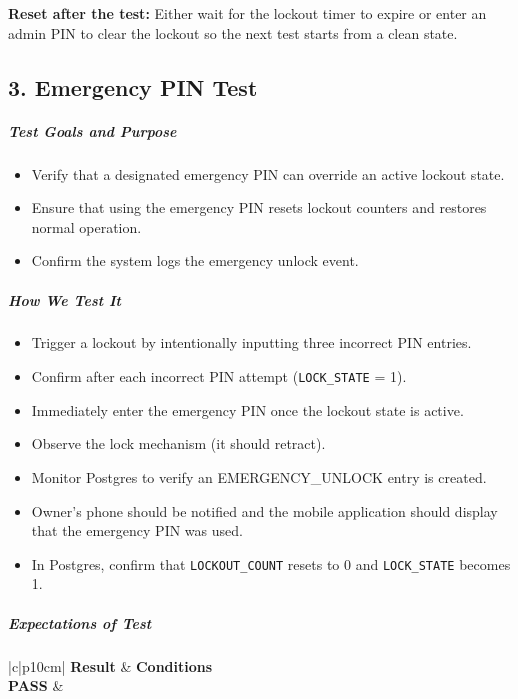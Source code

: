\noindent\textbf{Reset after the test:}  
Either wait for the lockout timer to expire or enter an admin PIN to clear the lockout so the next test starts from a clean state.\\


\newpage
\begin{samepage}
    \subsection*{3. Emergency PIN Test}
    \subparagraph{Test Goals and Purpose}
    \begin{itemize}
        \item Verify that a designated emergency PIN can override an active lockout state.
        \item Ensure that using the emergency PIN resets lockout counters and restores normal operation.
        \item Confirm the system logs the emergency unlock event.
    \end{itemize}
    \subparagraph{How We Test It}
    \begin{itemize}
        \item Trigger a lockout by intentionally inputting three incorrect PIN entries.
        \item Confirm after each incorrect PIN attempt (\texttt{LOCK\_STATE} = 1).
        \item Immediately enter the emergency PIN once the lockout state is active.
        \item Observe the lock mechanism (it should retract).
        \item Monitor Postgres to verify an EMERGENCY\_UNLOCK entry is created.
        \item Owner's phone should be notified and the mobile application should display that the emergency PIN was used.
        \item In Postgres, confirm that \texttt{LOCKOUT\_COUNT} resets to 0 and \texttt{LOCK\_STATE} becomes 1.
    \end{itemize}
    \subparagraph{Expectations of Test}
    \begin{center}
    \begin{tabular}{|c|p{10cm}|}
      \hline
      \textbf{Result} & \textbf{Conditions} \\
      \hline
      \textbf{PASS} &
        \begin{minipage}[t]{\linewidth}
        \begin{itemize}

\end{itemize}
\end{minipage}
\end{tabular}
\end{center}
\end{samepage}
